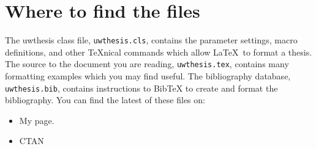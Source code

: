 \documentclass [11pt, proquest] {uwthesis}[2020/02/24]
\begin{document}
\printendnotes

%
%
\nocite{*}   %


%
%
\appendix
\raggedbottom\sloppy


\chapter{Where to find the files}

The uwthesis class file, {\tt uwthesis.cls}, contains the parameter settings,
macro definitions, and other \TeX nical commands which
allow \LaTeX\ to format a thesis.
The source to
the document you are reading, {\tt uwthesis.tex},
contains many formatting examples
which you may find useful.
The bibliography database, {\tt uwthesis.bib}, contains instructions
to BibTeX to create and format the bibliography.
You can find the latest of these files on:

\begin{itemize}
  \item My page.
        \begin{description}
          \item[] \verb%https://staff.washington.edu/fox/tex/thesis.shtml%
        \end{description}

  \item CTAN

\end{itemize}

\end{document}

